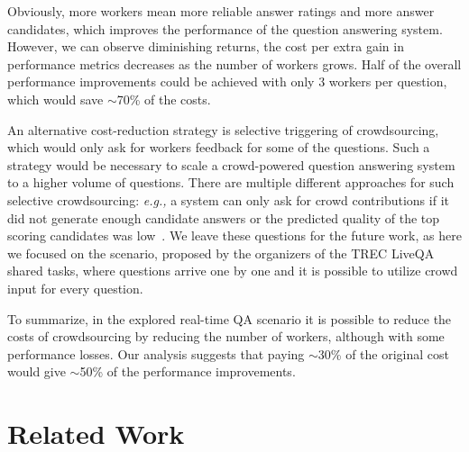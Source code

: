 \documentclass[letterpaper]{article}
\makeatletter
\newcommand{\eg}{\textit{e.g.,}\@\xspace}
\makeatother
\begin{document}
Obviously, more workers mean more reliable answer ratings and more answer candidates, which improves the performance of the question answering system.
However, we can observe diminishing returns, the cost per extra gain in performance metrics decreases as the number of workers grows.
Half of the overall performance improvements could be achieved with only 3 workers per question, which would save $\sim$70\% of the costs.

An alternative cost-reduction strategy is selective triggering of crowdsourcing, which would only ask for workers feedback for some of the questions.
Such a strategy would be necessary to scale a crowd-powered question answering system to a higher volume of questions.
There are multiple different approaches for such selective crowdsourcing: \eg a system can only ask for crowd contributions if it did not generate enough candidate answers or the predicted quality of the top scoring candidates was low~\cite{carmel2010estimating,he2006query}.
We leave these questions for the future work, as here we focused on the scenario, proposed by the organizers of the TREC LiveQA shared tasks, where questions arrive one by one and it is possible to utilize crowd input for every question.

To summarize, in the explored real-time QA scenario it is possible to reduce the costs of crowdsourcing by reducing the number of workers, although with some performance losses.
Our analysis suggests that paying $\sim$30\% of the original cost would give $\sim$50\% of the performance improvements.

\section{Related Work}
\label{sec:related_work}
\end{document}

